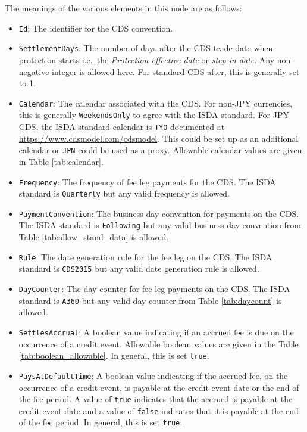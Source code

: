 The meanings of the various elements in this node are as follows:
\begin{itemize}

\item \lstinline!Id!:
The identifier for the CDS convention.

\item \lstinline!SettlementDays!:
The number of days after the CDS trade date when protection starts i.e.\ the \textit{Protection effective date} or \textit{step-in date}. Any non-negative integer is allowed here. For standard CDS after, this is generally set to 1.

\item \lstinline!Calendar!:
The calendar associated with the CDS. For non-JPY currencies, this is generally \lstinline!WeekendsOnly! to agree with the ISDA standard. For JPY CDS, the ISDA standard calendar is \lstinline!TYO! documented at \url{https://www.cdsmodel.com/cdsmodel}. This could be set up as an additional calendar or \lstinline!JPN! could be used as a proxy. Allowable calendar values are given in Table \ref{tab:calendar}.

\item \lstinline!Frequency!:
The frequency of fee leg payments for the CDS. The ISDA standard is \lstinline!Quarterly! but any valid frequency is allowed.

\item \lstinline!PaymentConvention!:
The business day convention for payments on the CDS. The ISDA standard is \lstinline!Following! but any valid business day convention from Table \ref{tab:allow_stand_data} is allowed.

\item \lstinline!Rule!:
The date generation rule for the fee leg on the CDS. The ISDA standard is \lstinline!CDS2015! but any valid date generation rule is allowed.

\item \lstinline!DayCounter!:
The day counter for fee leg payments on the CDS. The ISDA standard is \lstinline!A360! but any valid day counter from Table \ref{tab:daycount} is allowed.

\item \lstinline!SettlesAccrual!:
A boolean value indicating if an accrued fee is due on the occurrence of a credit event. Allowable boolean values are given in the Table \ref{tab:boolean_allowable}. In general, this is set \lstinline!true!.

\item \lstinline!PaysAtDefaultTime!:
A boolean value indicating if the accrued fee, on the occurrence of a credit event, is payable at the credit event date or the end of the fee period. A value of \lstinline!true! indicates that the accrued is payable at the credit event date and a value of \lstinline!false! indicates that it is payable at the end of the fee period. In general, this is set \lstinline!true!.

\end{itemize}
